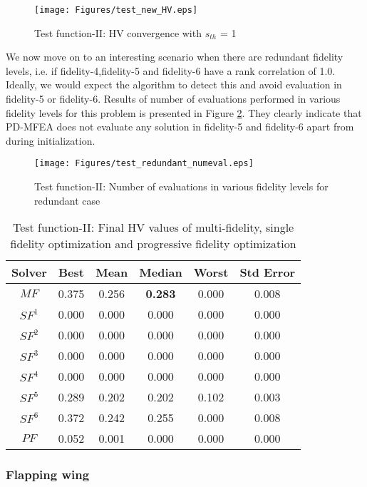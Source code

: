\begin{figure}[!ht]
	\centering
	\texttt{[image: Figures/test\_new\_HV.eps]}
	\caption{Test function-II: HV convergence with $s_{th}$ = 1}
	\label{fig:testfunc2_1sigma}
\end{figure}

We now move on to an interesting scenario when there are redundant fidelity levels, i.e. if fidelity-4,fidelity-5 and fidelity-6 have a rank correlation of 1.0. Ideally, we would expect the algorithm to detect this and avoid evaluation in fidelity-5 or fidelity-6. Results of number of evaluations performed in various fidelity levels for this problem is presented in Figure \ref{fig:testfunc2redundant}. They clearly indicate that PD-MFEA does not evaluate any solution in  fidelity-5 and fidelity-6 apart from during initialization.

\begin{figure}[!h]
	\centering
	\texttt{[image: Figures/test\_redundant\_numeval.eps]}
	\caption{Test function-II: Number of evaluations in various fidelity levels for redundant case}
	\label{fig:testfunc2redundant}      
\end{figure}

\begin{table}[!htb]\footnotesize
	\centering
	\caption{Test function-II: Final HV values of multi-fidelity, single fidelity optimization and progressive fidelity optimization}
	\label{tab:testfunc2hvstat}
	\begin{tabular}{|c|c|c|c|c|c|}
		\noalign{\smallskip}\hline
		Solver& Best &Mean & Median & Worst & Std Error\\ \hline
		$MF$&0.375&0.256&\textbf{0.283}&0.000&0.008\\ \hline
		$SF^1$&0.000&0.000&0.000&0.000&0.000\\ \hline
		$SF^2$&0.000&0.000&0.000&0.000&0.000\\ \hline
		$SF^3$&0.000&0.000&0.000&0.000&0.000\\ \hline
		$SF^4$&0.000&0.000&0.000&0.000&0.000\\ \hline
		$SF^5$&0.289&0.202&0.202&0.102&0.003\\ \hline
		$SF^6$&0.372&0.242&0.255&0.000&0.008\\ \hline
		$PF$&0.052&0.001&0.000&0.000&0.000\\ 
		\hline
	\end{tabular}
\end{table}

\subsubsection{Flapping wing}             


